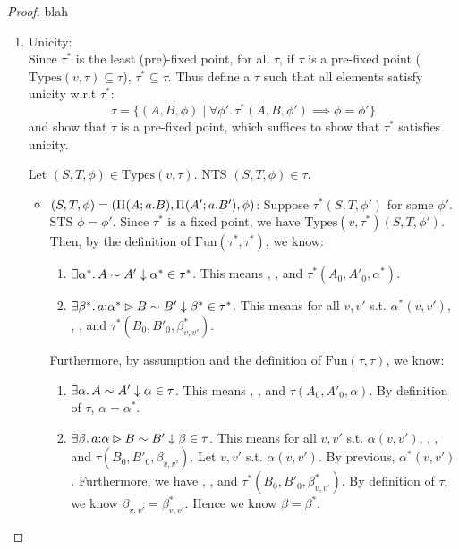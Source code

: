 \iffalse
\begin{proof}
blah
\begin{enumerate}
\item Unicity:\\
Since $\tau^*$ is the least (pre)-fixed point, for all $\tau$, if $\tau$ is a pre-fixed point 
($\text{Types}(v,\tau) \subseteq \tau$), $\tau^* \subseteq \tau$. Thus define a $\tau$ such that all elements 
satisfy unicity w.r.t $\tau^*$: 
\[\tau = \{(A,B,\phi) \mid \forall \phi'.\, \tau^*(A,B,\phi') \implies \phi = \phi'\}\]
and show that $\tau$ is a pre-fixed point, which suffices to show that $\tau^*$ satisfies unicity.

Let $(S,T,\phi) \in \text{Types}(v,\tau)$. NTS $(S,T,\phi) \in \tau$.
\begin{itemize}
  \item $(S,T,\phi) = (\arrabt{A}{a.B}{R}, \arrabt{A'}{a.B'}{R'}, \phi)$:
  Suppose $\tau^*(S,T,\phi')$ for some $\phi'$. STS $\phi = \phi'$.
  Since $\tau^*$ is a fixed point, we have $\text{Types}(v,\tau^*)(S,T,\phi')$.
  Then, by the definition of $\text{Fun}(\tau^*,\tau^*)$, we know:
  \begin{enumerate}
  \item $\exists \alpha^*.\, \sameType{A}{A'}{\alpha^*}{\tau^*}$. This means 
  , , and $\tau^*(A_0,A'_0,\alpha^*)$.
  \item $\exists \beta^*.\, \sameTypeOne{a}{\alpha^*}{B}{B'}{\beta^*}{\tau^*}$. This means
  for all $v,v'$ s.t. $\alpha^*(v,v')$, , , and $\tau^*(B_0,B'_0,\beta^*_{v,v'})$.
  \end{enumerate}
  Furthermore, by assumption and the definition of $\text{Fun}(\tau,\tau)$, we know:
  \begin{enumerate}
  \item $\exists \alpha.\, \sameType{A}{A'}{\alpha}{\tau}$. This means 
  , , and $\tau(A_0,A'_0,\alpha)$. By definition of $\tau$, $\alpha = \alpha^*$.
  \item $\exists \beta.\, \sameTypeOne{a}{\alpha}{B}{B'}{\beta}{\tau}$. This means
  for all $v,v'$ s.t. $\alpha(v,v')$, , , and $\tau(B_0,B'_0,\beta_{v,v'})$.
  Let $v,v'$ s.t. $\alpha(v,v')$. By previous, $\alpha^*(v,v')$. Furthermore, we have
  , , and $\tau^*(B_0,B'_0,\beta^*_{v,v'})$.
  By definition of $\tau$, we know $\beta_{v,v'} = \beta^*_{v,v'}$. Hence we know $\beta = \beta^*$.
  \end{enumerate}

\end{itemize}
\end{enumerate}
\end{proof}
